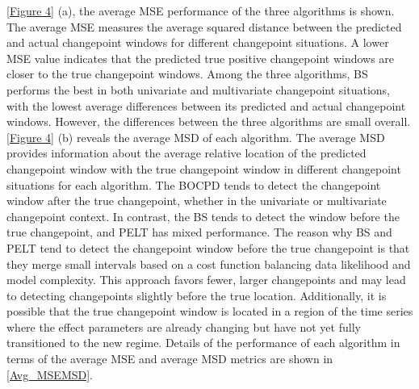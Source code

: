 \documentclass[]{interact}
\theoremstyle{plain}%
\theoremstyle{definition}
\theoremstyle{remark}
\begin{document}
{    \autoref{Figure 4} (a), the average MSE performance of the three algorithms is shown. The average MSE measures the average squared distance between the predicted and actual changepoint windows for different changepoint situations. A lower MSE value indicates that the predicted true positive changepoint windows are closer to the true changepoint windows. Among the three algorithms, BS performs the best in both univariate and multivariate changepoint situations, with the lowest average differences between its predicted and actual changepoint windows. However, the differences between the three algorithms are small overall. \\
    
    \autoref{Figure 4} (b) reveals the average MSD of each algorithm. The average MSD provides information about the average relative location of the predicted changepoint window with the true changepoint window in different changepoint situations for each algorithm. The BOCPD tends to detect the changepoint window after the true changepoint, whether in the univariate or multivariate changepoint context. In contrast, the BS tends to detect the window before the true changepoint, and PELT has mixed performance. The reason why BS and PELT tend to detect the changepoint window before the true changepoint is that they merge small intervals based on a cost function balancing data likelihood and model complexity\cite{killickOptimalDetectionChangepoints2012}. This approach favors fewer, larger changepoints and may lead to detecting changepoints slightly before the true location\citealp{fearnheadChangepointDetectionPresence2019}. Additionally, it is possible that the true changepoint window is located in a region of the time series where the effect parameters are already changing but have not yet fully transitioned to the new regime. Details of the performance of each algorithm in terms of the average MSE and average MSD metrics are shown in \autoref{Avg_MSEMSD}.

}
\end{document}
